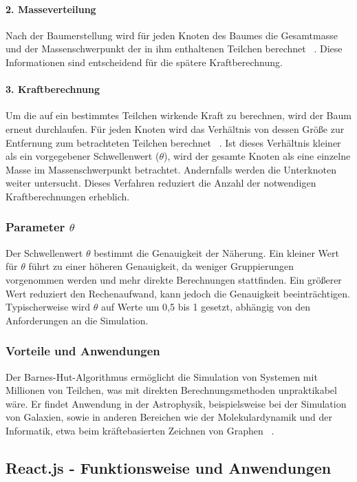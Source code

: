 \documentclass[a4paper,12pt,twoside]{article}
\begin{document}
\paragraph{2. Masseverteilung}
Nach der Baumerstellung wird für jeden Knoten des Baumes die Gesamtmasse und der Massenschwerpunkt der in ihm enthaltenen Teilchen berechnet ~\cite{Burtscher&Pingali2011}. Diese Informationen sind entscheidend für die spätere Kraftberechnung.

\paragraph{3. Kraftberechnung}
Um die auf ein bestimmtes Teilchen wirkende Kraft zu berechnen, wird der Baum erneut durchlaufen. Für jeden Knoten wird das Verhältnis von dessen Größe zur Entfernung zum betrachteten Teilchen berechnet ~\cite{BarnesHutBeltoforion}. Ist dieses Verhältnis kleiner als ein vorgegebener Schwellenwert ($\theta$), wird der gesamte Knoten als eine einzelne Masse im Massenschwerpunkt betrachtet. Andernfalls werden die Unterknoten weiter untersucht. Dieses Verfahren reduziert die Anzahl der notwendigen Kraftberechnungen erheblich.

\subsubsection{Parameter $\theta$}
Der Schwellenwert $\theta$ bestimmt die Genauigkeit der Näherung. Ein kleiner Wert für $\theta$ führt zu einer höheren Genauigkeit, da weniger Gruppierungen vorgenommen werden und mehr direkte Berechnungen stattfinden. Ein größerer Wert reduziert den Rechenaufwand, kann jedoch die Genauigkeit beeinträchtigen. Typischerweise wird $\theta$ auf Werte um 0,5 bis 1 gesetzt, abhängig von den Anforderungen an die Simulation.

\subsubsection{Vorteile und Anwendungen}
Der Barnes-Hut-Algorithmus ermöglicht die Simulation von Systemen mit Millionen von Teilchen, was mit direkten Berechnungsmethoden unpraktikabel wäre. Er findet Anwendung in der Astrophysik, beispielsweise bei der Simulation von Galaxien, sowie in anderen Bereichen wie der Molekulardynamik und der Informatik, etwa beim kräftebasierten Zeichnen von Graphen ~\cite{Heer2017}.

\subsection{React.js - Funktionsweise und Anwendungen}
\end{document}
